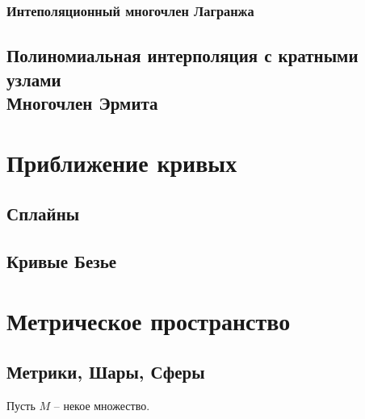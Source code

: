 \documentclass[a4paper,12pt]{article}
\begin{document}
\subsubsection{Интеполяционный многочлен Лагранжа}

\subsection{Полиномиальная интерполяция с кратными узлами \\ Многочлен Эрмита}


\newpage
\section{Приближение кривых}

\subsection{Сплайны}

\subsection{Кривые Безье}

\newpage
\section{Метрическое пространство}

\subsection{Метрики, Шары, Сферы}

Пусть $M$ -- некое множество.
\end{document}
